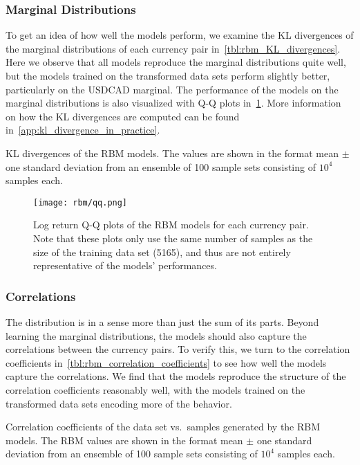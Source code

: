 \subsubsection{Marginal Distributions}
To get an idea of how well the models perform, we examine the KL divergences of the marginal distributions of each currency pair in~\cref{tbl:rbm_KL_divergences}.
Here we observe that all models reproduce the marginal distributions quite well, but the models trained on the transformed data sets perform slightly better, particularly on the USDCAD marginal.
The performance of the models on the marginal distributions is also visualized with Q-Q plots in~\cref{fig:rbm_qq_plots}.
More information on how the KL divergences are computed can be found in~\cref{app:kl_divergence_in_practice}.
\begin{table}[!htb]
    \centering
    \begin{adjustbox}{max width=\textwidth}
        
    \end{adjustbox}
    \caption{
        KL divergences of the RBM models.
        The values are shown in the format mean \(\pm\) one standard deviation from an ensemble of 100 sample sets consisting of \( 10^4 \) samples each.
    }
    \label{tbl:rbm_KL_divergences}
\end{table}
\begin{figure}[!htb]
    \begin{center}
        \texttt{[image: rbm/qq.png]}
    \end{center}
    \caption{Log return Q-Q plots of the RBM models for each currency pair. Note that these plots only use the same number of samples as the size of the training data set (5165), and thus are not entirely representative of the models' performances.}
    \label{fig:rbm_qq_plots}
\end{figure}

\subsubsection{Correlations}
The distribution is in a sense more than just the sum of its parts.
Beyond learning the marginal distributions, the models should also capture the correlations between the currency pairs.
To verify this, we turn to the correlation coefficients in~\cref{tbl:rbm_correlation_coefficients} to see how well the models capture the correlations.
We find that the models reproduce the structure of the correlation coefficients reasonably well, with the models trained on the transformed data sets encoding more of the behavior.
\begin{table}[!htb]
    \centering
    \begin{adjustbox}{max width=\textwidth}
        
    \end{adjustbox}
    \caption{Correlation coefficients of the data set vs.~samples generated by the RBM models. The RBM values are shown in the format mean \(\pm\) one standard deviation from an ensemble of 100 sample sets consisting of \( 10^4 \) samples each.}
    \label{tbl:rbm_correlation_coefficients}
\end{table}

